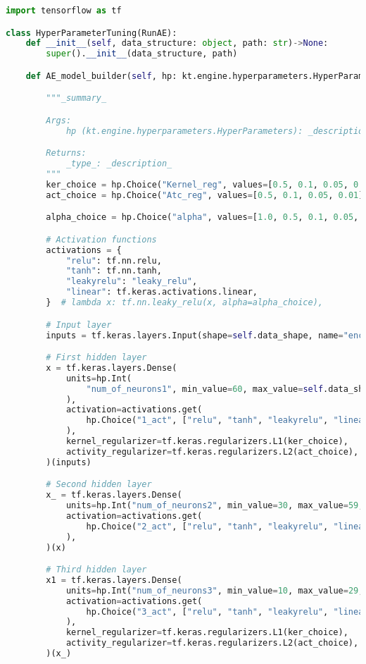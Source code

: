 \begin{lstlisting}[language=Python, style=pythonstyle, label={code:ae_code_arch}]
import tensorflow as tf

class HyperParameterTuning(RunAE):
    def __init__(self, data_structure: object, path: str)->None:
        super().__init__(data_structure, path)

    def AE_model_builder(self, hp: kt.engine.hyperparameters.HyperParameters):

        """_summary_

        Args:
            hp (kt.engine.hyperparameters.HyperParameters): _description_

        Returns:
            _type_: _description_
        """
        ker_choice = hp.Choice("Kernel_reg", values=[0.5, 0.1, 0.05, 0.01])
        act_choice = hp.Choice("Atc_reg", values=[0.5, 0.1, 0.05, 0.01])

        alpha_choice = hp.Choice("alpha", values=[1.0, 0.5, 0.1, 0.05, 0.01])

        # Activation functions
        activations = {
            "relu": tf.nn.relu,
            "tanh": tf.nn.tanh,
            "leakyrelu": "leaky_relu",
            "linear": tf.keras.activations.linear,
        }  # lambda x: tf.nn.leaky_relu(x, alpha=alpha_choice),

        # Input layer
        inputs = tf.keras.layers.Input(shape=self.data_shape, name="encoder_input")

        # First hidden layer
        x = tf.keras.layers.Dense(
            units=hp.Int(
                "num_of_neurons1", min_value=60, max_value=self.data_shape - 1, step=1
            ),
            activation=activations.get(
                hp.Choice("1_act", ["relu", "tanh", "leakyrelu", "linear"])
            ),
            kernel_regularizer=tf.keras.regularizers.L1(ker_choice),
            activity_regularizer=tf.keras.regularizers.L2(act_choice),
        )(inputs)

        # Second hidden layer
        x_ = tf.keras.layers.Dense(
            units=hp.Int("num_of_neurons2", min_value=30, max_value=59, step=1),
            activation=activations.get(
                hp.Choice("2_act", ["relu", "tanh", "leakyrelu", "linear"])
            ),
        )(x)

        # Third hidden layer
        x1 = tf.keras.layers.Dense(
            units=hp.Int("num_of_neurons3", min_value=10, max_value=29, step=1),
            activation=activations.get(
                hp.Choice("3_act", ["relu", "tanh", "leakyrelu", "linear"])
            ),
            kernel_regularizer=tf.keras.regularizers.L1(ker_choice),
            activity_regularizer=tf.keras.regularizers.L2(act_choice),
        )(x_)


\end{lstlisting}
